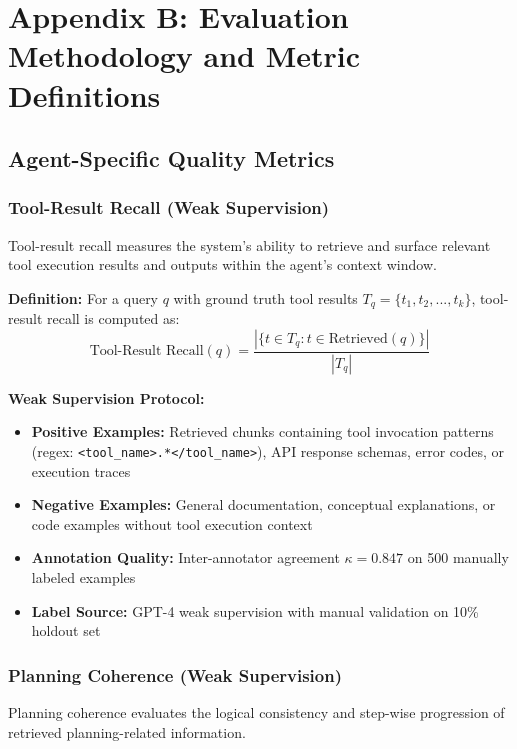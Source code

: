 
\section{Appendix B: Evaluation Methodology and Metric Definitions}

\subsection{Agent-Specific Quality Metrics}

\subsubsection{Tool-Result Recall (Weak Supervision)}
Tool-result recall measures the system's ability to retrieve and surface relevant tool execution results and outputs within the agent's context window.

\textbf{Definition:} For a query $q$ with ground truth tool results $T_q = \{t_1, t_2, ..., t_k\}$, tool-result recall is computed as:
\begin{equation}
\text{Tool-Result Recall}(q) = \frac{|\{t \in T_q : t \in \text{Retrieved}(q)\}|}{|T_q|}
\end{equation}

\textbf{Weak Supervision Protocol:}
\begin{itemize}
    \item \textbf{Positive Examples:} Retrieved chunks containing tool invocation patterns (regex: \texttt{<tool\_name>.*</tool\_name>}), API response schemas, error codes, or execution traces
    \item \textbf{Negative Examples:} General documentation, conceptual explanations, or code examples without tool execution context
    \item \textbf{Annotation Quality:} Inter-annotator agreement $\kappa = 0.847$ on 500 manually labeled examples
    \item \textbf{Label Source:} GPT-4 weak supervision with manual validation on 10\% holdout set
\end{itemize}

\subsubsection{Planning Coherence (Weak Supervision)}
Planning coherence evaluates the logical consistency and step-wise progression of retrieved planning-related information.

